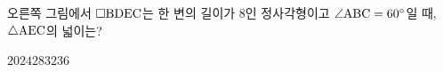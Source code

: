 \noindent\begin{minipage}[t]{0.58\linewidth}\vspace{0pt}\raggedright 오른쪽 그림에서 $\square\mathrm{BDEC}$는 한 변의 길이가 $8$인 정사각형이고 $\angle\mathrm{ABC}=60^\circ$일 때, $\triangle\mathrm{AEC}$의 넓이는?\end{minipage}\hfill\begin{minipage}[t]{0.4\linewidth}\vspace{0pt}\centering \resizebox{\ifdim\width>\linewidth\linewidth\else\width\fi}{!}{}\end{minipage}\par
\begin{choicesii}{$20$}{$24$}{$28$}{$32$}{$36$}\end{choicesii}
